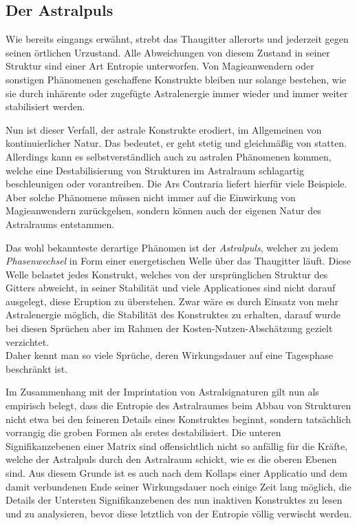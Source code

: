 \documentclass[a5paper,8pt]{book}
\begin{document}
\subsection{Der Astralpuls}
\begin{multicols}{2}
Wie bereits eingangs erwähnt, strebt das Thaugitter allerorts und jederzeit gegen seinen örtlichen Urzustand. Alle
Abweichungen von diesem Zustand in seiner Struktur sind einer Art Entropie unterworfen. Von Magieanwendern oder
sonstigen Phänomenen geschaffene Konstrukte bleiben nur solange bestehen, wie sie durch inhärente oder zugefügte
Astralenergie immer wieder und immer weiter stabilisiert werden.

Nun ist dieser Verfall, der astrale Konstrukte erodiert, im Allgemeinen von kontinuierlicher Natur. Das bedeutet, er
geht stetig und gleichmäßig von statten. Allerdings kann es selbstverständlich auch zu astralen Phänomenen kommen,
welche eine Destabilisierung von Strukturen im Astralraum schlagartig beschleunigen oder vorantreiben. Die
Ars Contraria liefert hierfür viele Beispiele. Aber solche Phänomene müssen nicht immer auf die Einwirkung von
Magieanwendern zurückgehen, sondern können auch der eigenen Natur des Astralraums entstammen.

Das wohl bekannteste derartige Phänomen ist der \textit{Astralpuls}, welcher zu jedem \textit{Phasenwechsel}
\footnotemark[5]
in Form einer
energetischen Welle über das Thaugitter läuft. Diese Welle belastet jedes Konstrukt, welches von der ursprünglichen
Struktur des Gitters abweicht, in seiner Stabilität und viele Applicationes sind nicht darauf ausgelegt, diese Eruption
zu überstehen. Zwar wäre es durch Einsatz von mehr Astralenergie möglich, die Stabilität des Konstruktes zu erhalten,
darauf wurde bei diesen Sprüchen aber im Rahmen der Kosten-Nutzen-Abschätzung gezielt verzichtet.\\ 
Daher kennt man so viele Sprüche, deren Wirkungsdauer auf eine Tagesphase beschränkt ist.

Im Zusammenhang mit der Imprintation von Astralsignaturen gilt nun als empirisch belegt, dass die
Entropie des Astralraumes beim Abbau von Strukturen nicht etwa bei den feineren Details eines Konstruktes
beginnt, sondern tatsächlich vorrangig die groben Formen als erstes destabilisiert. Die unteren
Signifikanzebenen einer Matrix sind offensichtlich nicht so anfällig für die Kräfte, welche der
Astralpuls durch den Astralraum schickt, wie es die oberen Ebenen sind. Aus diesem Grunde ist es auch nach
dem Kollaps einer Applicatio und dem damit verbundenen Ende seiner Wirkungsdauer noch einige Zeit lang möglich, die
Details der Untersten Signifikanzebenen des nun inaktiven Konstruktes zu lesen und zu analysieren, bevor diese
letztlich von der Entropie völlig verwischt werden.


\end{multicols}
\end{document}
